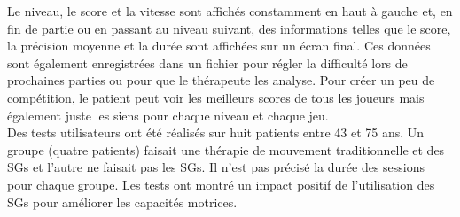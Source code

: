 		Le niveau, le score et la vitesse sont affichés constamment en haut à gauche et, en fin de partie ou en passant au niveau suivant, des informations telles que le score, la précision moyenne et la durée sont affichées sur un écran final. Ces données sont également enregistrées dans un fichier pour régler la difficulté lors de prochaines parties ou pour que le thérapeute les analyse. Pour créer un peu de compétition, le patient peut voir les meilleurs scores de tous les joueurs mais également juste les siens pour chaque niveau et chaque jeu.
		\\
		
		Des tests utilisateurs ont été réalisés sur huit patients entre 43 et 75 ans. Un groupe (quatre patients) faisait une thérapie de mouvement traditionnelle et des SGs et l'autre ne faisait pas les SGs. Il n'est pas précisé la durée des sessions pour chaque groupe. Les tests ont montré un impact positif de l'utilisation des SGs pour améliorer les capacités motrices.




